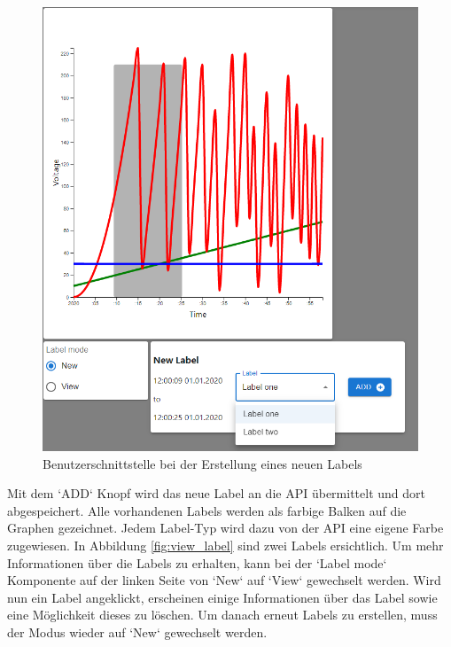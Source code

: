 \begin{figure}[H]
    \centering
    \includegraphics[width=1.0\textwidth]{gfx/newLabel}
    \caption{Benutzerschnittstelle bei der Erstellung eines neuen Labels}
    \label{fig:add_label}
\end{figure}
Mit dem `ADD` Knopf wird das neue Label an die \ac{API} übermittelt und dort abgespeichert.
Alle vorhandenen Labels werden als farbige Balken auf die Graphen gezeichnet.
Jedem Label-Typ wird dazu von der \ac{API} eine eigene Farbe zugewiesen.
In Abbildung \ref{fig:view_label} sind zwei Labels ersichtlich.
Um mehr Informationen über die Labels zu erhalten, kann bei der `Label mode` Komponente auf der linken Seite von
`New` auf `View` gewechselt werden.
Wird nun ein Label angeklickt,
erscheinen einige Informationen über das Label sowie eine Möglichkeit dieses zu löschen.
Um danach erneut Labels zu erstellen, muss der Modus wieder auf `New` gewechselt werden.




